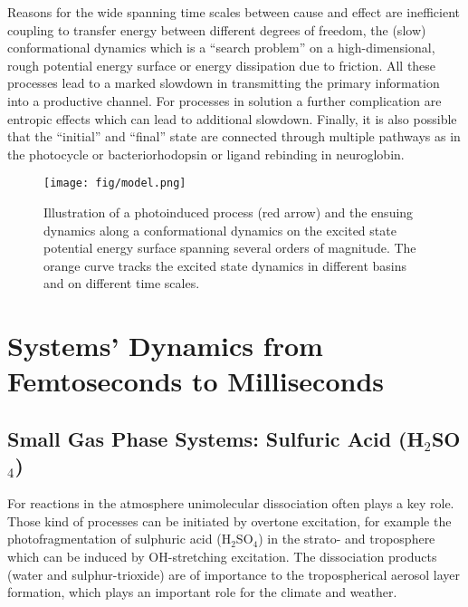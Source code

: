 \documentclass[journal=jacsat,manuscript=article]{achemso}
\begin{document}
Reasons for the wide spanning time scales between cause and effect are
inefficient coupling to transfer energy between different degrees of
freedom, the (slow) conformational dynamics which is a ``search
problem'' on a high-dimensional, rough potential energy surface or
energy dissipation due to friction. All these processes lead to a
marked slowdown in transmitting the primary information into a
productive channel. For processes in solution a further complication
are entropic effects which can lead to additional slowdown. Finally,
it is also possible that the ``initial'' and ``final'' state are
connected through multiple pathways as in the photocycle or
bacteriorhodopsin\cite{korenstein:1978,hendriks:1999} or ligand
rebinding in neuroglobin.\cite{MM.cei:2013}

\begin{figure}[t]
\centering
\texttt{[image: fig/model.png]}
\caption{Illustration of a photoinduced process (red arrow) and the
  ensuing dynamics along a conformational dynamics on the excited
  state potential energy surface spanning several orders of
  magnitude. The orange curve tracks the excited state dynamics in
  different basins and on different time scales.}
\label{fig:model}
\end{figure}




\section{Systems' Dynamics from Femtoseconds to Milliseconds}


\subsection{Small Gas Phase Systems: Sulfuric Acid (H$_2$SO$_4$)}
For reactions in the atmosphere unimolecular dissociation often plays
a key role. Those kind of processes can be initiated by overtone
excitation, for example the photofragmentation of sulphuric acid
(H$_2$SO$_4$) in the strato- and troposphere which can be induced by
OH-stretching excitation. The dissociation products (water and
sulphur-trioxide) are of importance to the tropospherical aerosol
layer formation, which plays an important role for the climate and
weather\cite{vaida.sci.2003.vibphotodis}.\\
\end{document}
